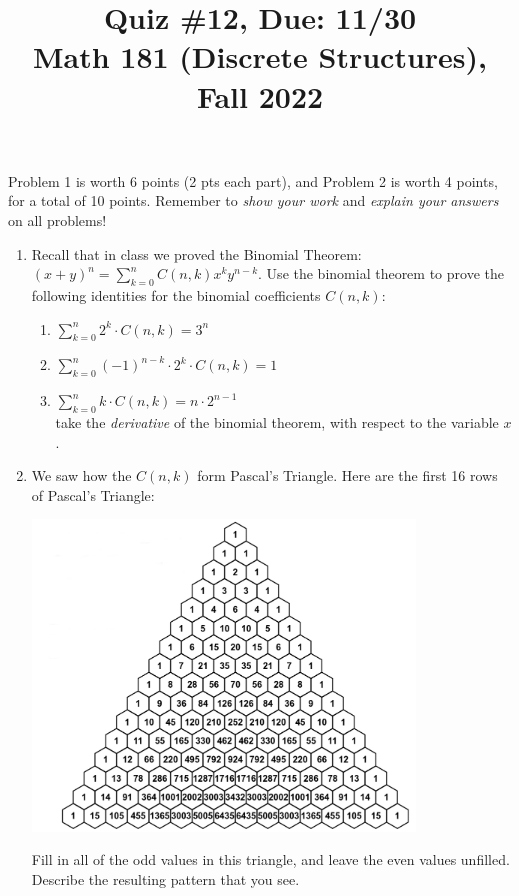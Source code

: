 \documentclass[11pt]{article}
\title{Quiz \#12, Due: 11/30 \\Math 181 (Discrete Structures), Fall 2022}
\date{}
\begin{document}
\maketitle

\thispagestyle{empty}

\vspace{-1cm}

Problem 1 is worth 6 points (2 pts each part), and Problem 2 is worth 4 points, for a total of 10 points. Remember to \emph{show your work} and \emph{explain your answers} on all problems!

\begin{enumerate}

\item Recall that in class we proved the Binomial Theorem: $(x+y)^n = \sum_{k=0}^{n} C(n,k) x^{k} y^{n-k}$. Use the binomial theorem to prove the following identities for the binomial coefficients $C(n,k)$:
\begin{enumerate}
\item $\sum_{k=0}^{n} 2^k \cdot C(n,k) = 3^n$
\item $\sum_{k=0}^{n} (-1)^{n-k} \cdot 2^k \cdot C(n,k) = 1$
\item $\sum_{k=0}^{n} k \cdot C(n,k) = n \cdot 2^{n-1}$ \\  take the \emph{derivative} of the binomial theorem, with respect to the variable $x$.
\end{enumerate}

\item We saw how the $C(n,k)$ form Pascal's Triangle. Here are the first 16 rows of Pascal's Triangle:
\begin{center}
\includegraphics[width=4in]{pascal.png}
\end{center}
Fill in all of the odd values in this triangle, and leave the even values unfilled. Describe the resulting pattern that you see.



\end{enumerate}
\end{document}
